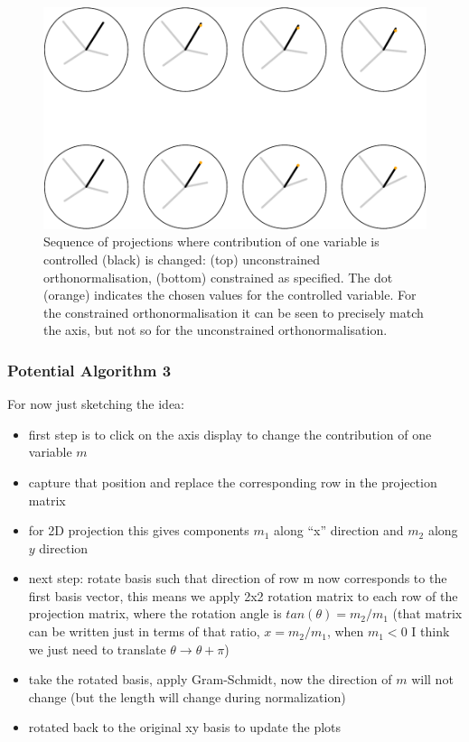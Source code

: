 \documentclass[]{interact}
\theoremstyle{plain}%
\theoremstyle{definition}
\theoremstyle{remark}
\providecommand{\tightlist}{%
  \setlength{\itemsep}{0pt}\setlength{\parskip}{0pt}}
\def\tightlist{}
\begin{document}
\begin{figure}
\includegraphics[width=1\linewidth]{paper_files/figure-latex/manualsequence-1} \caption{Sequence of projections where contribution of one variable is controlled (black) is changed: (top) unconstrained orthonormalisation, (bottom) constrained as specified. The dot (orange) indicates the chosen values for the controlled variable. For the constrained orthonormalisation it can be seen to precisely match the axis, but not so for the unconstrained orthonormalisation.}\label{fig:manualsequence}
\end{figure}

\hypertarget{potential-algorithm-3}{%
\subsubsection{Potential Algorithm 3}\label{potential-algorithm-3}}

For now just sketching the idea:

\begin{itemize}
\tightlist
\item
  first step is to click on the axis display to change the contribution
  of one variable \(m\)
\item
  capture that position and replace the corresponding row in the
  projection matrix
\item
  for 2D projection this gives components \(m_1\) along ``x'' direction
  and \(m_2\) along \(y\) direction
\item
  next step: rotate basis such that direction of row m now corresponds
  to the first basis vector, this means we apply 2x2 rotation matrix to
  each row of the projection matrix, where the rotation angle is
  \(tan(\theta) = m_2/m_1\) (that matrix can be written just in terms of
  that ratio, \(x= m_2/m_1\), when \(m_1<0\) I think we just need to
  translate \(\theta \rightarrow \theta + \pi\))
\item
  take the rotated basis, apply Gram-Schmidt, now the direction of \(m\)
  will not change (but the length will change during normalization)
\item
  rotated back to the original xy basis to update the plots
\end{itemize}
\end{document}
